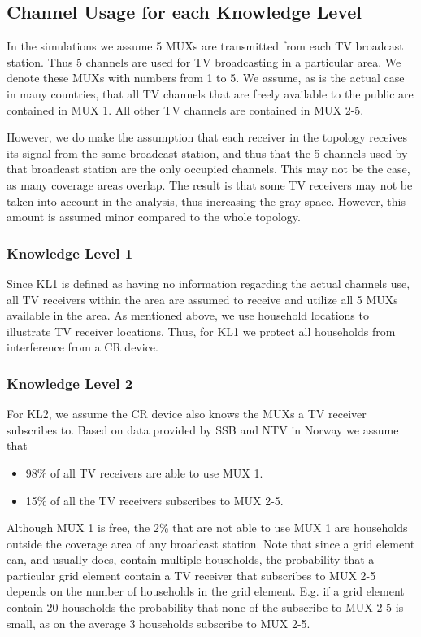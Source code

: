 \documentclass[journal,11pt,draftclsnofoot,onecolumn]{IEEEtran}
\begin{document}
\subsection{Channel Usage for each Knowledge Level}
In the simulations we assume 5 MUXs are transmitted from each TV broadcast station. Thus 5 channels are used for TV broadcasting in a particular area. We denote these MUXs with numbers from 1 to 5. We assume, as is the actual case in many countries, that all TV channels that are freely available to the public are contained in MUX 1. All other TV channels are contained in MUX 2-5.

However, we do make the assumption that each receiver in the topology receives its signal from the same broadcast station, and thus that the 5 channels used by that broadcast station are the only occupied channels. This may not be the case, as many coverage areas overlap. The result is that some TV receivers may not be taken into account in the analysis, thus increasing the gray space. However, this amount is assumed minor compared to the whole topology.

\subsubsection{Knowledge Level 1}
Since KL1 is defined as having no information regarding the actual channels use, all TV receivers within the area are assumed to receive and utilize all 5 MUXs available in the area. As mentioned above, we use household locations to illustrate TV receiver locations. Thus, for KL1 we protect all households from interference from a CR device.

\subsubsection{Knowledge Level 2}
For KL2, we assume the CR device also knows the MUXs a TV receiver subscribes to. Based on data provided by SSB and NTV in Norway \cite{barometer}\cite{digitalkringkasting} we assume that
\begin{itemize}
\item 98\% of all TV receivers are able to use MUX 1.
\item 15\% of all the TV receivers subscribes to MUX 2-5.
\end{itemize}
Although MUX 1 is free, the 2\% that are not able to use MUX 1 are households outside the coverage area of any broadcast station. Note that since a grid element can, and usually does, contain multiple households, the probability that a particular grid element contain a TV receiver that subscribes to MUX 2-5 depends on the number of households in the grid element. E.g. if a grid element contain 20 households the probability that none of the subscribe to MUX 2-5 is small, as on the average 3 households subscribe to MUX 2-5.
\end{document}
